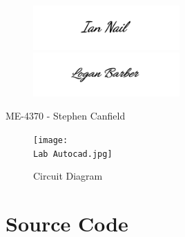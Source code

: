 \documentclass[a4paper,12pt]{article} %
\begin{document}
\maketitle %
\vspace{3cm}

\begin{figure}[h!]
\centering
    \includegraphics[width=0.5\textwidth]{IANsignature.png}
    \includegraphics[width=0.5\textwidth]{LOGANsignature.png}
  \end{figure}
\begin{center}
\vspace{3cm}
ME-4370 - Stephen Canfield
\end{center}
\pagebreak



\begin{figure}[h!]
\centering
    \texttt{[image: \\Lab Autocad.jpg]}
    \caption{Circuit Diagram}
  \end{figure}



\clearpage
\section{Source Code} %
\vspace{5mm}
\linespread{1}

\linespread{1.6}
\vspace{5mm}
\end{document}
